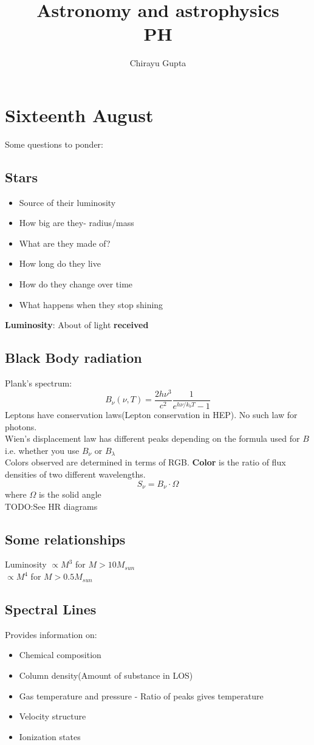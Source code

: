 \documentclass{scrartcl}
\title{ Astronomy and astrophysics \\ \large{ PH } }
\author{Chirayu Gupta}
\date{}
\begin{document}
\section{Sixteenth August}
Some questions to ponder:
\subsection{Stars}
\begin{itemize}
	\item Source of their luminosity
	\item How big are they- radius/mass
	\item What are they made of?
	\item How long do they live
	\item How do they change over time
	\item What happens when they stop shining
\end{itemize}
\textbf{Luminosity}: About of light \textbf{received}
\subsection{Black Body radiation}
Plank's spectrum:
\[ B_\nu(\nu,T) = \displaystyle\frac{2h\nu^3}{c^2} \displaystyle\frac{1}{e^{h\nu / k_b T} -1 } \]
Leptons have conservation laws(Lepton conservation in HEP). No such law for photons.\\
Wien's displacement law has different peaks depending on the formula used for \( B\) i.e. whether you use \( B_\nu \) or \( B_\lambda \)\\
Colors observed are determined in terms of RGB. \textbf{Color} is the ratio of flux densities of two different wavelengths.
\[ S_\nu = B_\nu \cdot \Omega \] 
where \( \Omega \) is the solid angle\\
TODO:See HR diagrams\\
\subsection{Some relationships}
Luminosity \( \propto M^3 \) for \( M> 10 M_{sun} \)\\
\(\propto M^4 \) for \( M>0.5 M_{sun} \)
\subsection{Spectral Lines}
Provides information on:
\begin{itemize}
	\item Chemical composition
	\item Column density(Amount of substance in LOS)
	\item Gas temperature and pressure - Ratio of peaks gives temperature
	\item Velocity structure
	\item Ionization states
\end{itemize}
\end{document}
